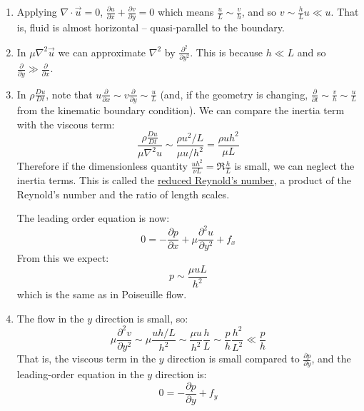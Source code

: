 \documentclass[../Main.tex]{subfiles}
\begin{document}
\begin{enumerate}
    \item Applying $\nabla \cdot \vec{u} = 0$, $\frac{\partial u}{\partial x} + \frac{\partial v}{\partial y} = 0$ which means $\frac u L \sim \frac v h$, and so $v \sim \frac h L u \ll u$. That is, fluid is almost horizontal -- quasi-parallel to the boundary.
    \item In $\mu \nabla^2\vec u$ we can approximate $\nabla^2$ by $\frac{\partial^{2}}{\partial y^{2}}$. This is because $h \ll L$ and so $\frac{\partial}{\partial y} \gg \frac{\partial}{\partial x}$.
    \item In $\rho \frac{D u}{D t}$, note that $u \frac{\partial }{\partial x} \sim v \frac{\partial }{\partial y} \sim \frac{u}{L}$ (and, if the geometry is changing, $\frac{\partial}{\partial t} \sim \frac{v}{h} \sim \frac{u}{L}$ from the kinematic boundary condition). We can compare the inertia term with the viscous term:
        \begin{equation*}
            \frac{\rho \frac{D u}{D t}}{\mu \nabla^2 u} \sim \frac{\rho u^2 / L}{\mu u / h^2} = \frac{\rho u h^2}{\mu L}
        \end{equation*}
        Therefore if the dimensionless quantity $\frac{uh^2}{\nu L} = \Re \frac{h}{L}$ is small, we can neglect the inertia terms. This is called the \underline{reduced Reynold's number}, a product of the Reynold's number and the ratio of length scales.

        The leading order equation is now:
        \begin{equation*}
            0 = -\frac{\partial p}{\partial x} + \mu \frac{\partial^{2}u}{\partial y^{2}} + f_x
        \end{equation*}
        From this we expect:
        \begin{equation*}
            p \sim \frac{\mu u L}{h^2}
        \end{equation*}
        which is the same as in Poiseuille flow.
    \item The flow in the $y$ direction is small, so:
        \begin{equation*}
            \mu \frac{\partial^{2}v}{\partial y^{2}} \sim \mu \frac{uh / L}{h^2} \sim \frac{\mu u}{h^2} \frac{h}{L} \sim \frac{p}{h} \frac{h^2}{L^2} \ll \frac{p}{h}
        \end{equation*}
        That is, the viscous term in the $y$ direction is small compared to $\frac{\partial p}{\partial y}$, and the leading-order equation in the $y$ direction is:
        \begin{equation*}
            0 = -\frac{\partial p}{\partial y} + f_y
        \end{equation*}
\end{enumerate}
\end{document}
